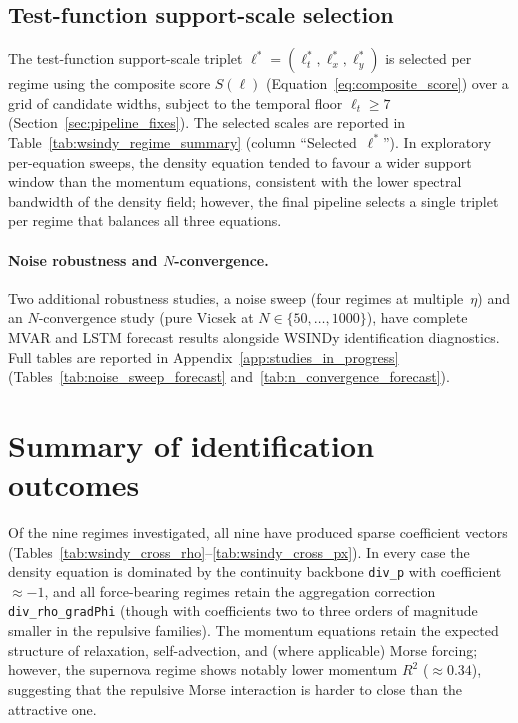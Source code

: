 \subsection{Test-function support-scale selection}
\label{sec:wsindy_lag_selection}

The test-function support-scale triplet
$\boldsymbol{\ell}^*=(\ell_t^*,\ell_x^*,\ell_y^*)$ is selected per
regime using the composite score
$S(\boldsymbol{\ell})$
(Equation~\ref{eq:composite_score}) over a grid of candidate widths,
subject to the temporal floor $\ell_t \geq 7$
(Section~\ref{sec:pipeline_fixes}).
The selected scales are reported in Table~\ref{tab:wsindy_regime_summary}
(column ``Selected~$\boldsymbol{\ell}^*$'').  In exploratory
per-equation sweeps, the density equation tended to favour a wider
support window than the momentum equations, consistent with the lower
spectral bandwidth of the density field; however, the final pipeline
selects a single triplet per regime that balances all three equations.

\paragraph{Noise robustness and $N$-convergence.}
\label{sec:wsindy_noise}
\label{sec:wsindy_n_convergence}

Two additional robustness studies, a noise sweep (four regimes at
multiple~$\eta$) and an $N$-convergence study (pure Vicsek at
$N\in\{50,\ldots,1000\}$), have complete MVAR and LSTM forecast
results alongside WSINDy identification diagnostics.  Full tables are
reported in Appendix~\ref{app:studies_in_progress}
(Tables~\ref{tab:noise_sweep_forecast}
and~\ref{tab:n_convergence_forecast}).

\section{Summary of identification outcomes}
\label{sec:wsindy_outcomes}

Of the nine regimes investigated, all nine have produced sparse coefficient
vectors (Tables~\ref{tab:wsindy_cross_rho}--\ref{tab:wsindy_cross_px}).
In every case the density equation is dominated by the continuity backbone
\texttt{div\_p} with coefficient~$\approx -1$, and all force-bearing
regimes retain the aggregation correction \texttt{div\_rho\_gradPhi}
(though with coefficients two to three orders of magnitude smaller
in the repulsive families).  The
momentum equations retain the expected structure of relaxation,
self-advection, and (where applicable) Morse forcing; however, the
supernova regime shows notably lower momentum $R^2$ ($\approx 0.34$),
suggesting that the repulsive Morse interaction is harder to close than
the attractive one.

